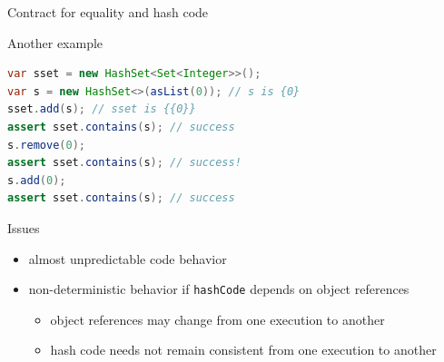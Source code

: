 \documentclass[10pt,usenames,dvipsnames]{beamer}
\begin{document}
\begin{frame}[fragile]{Contract for equality and hash code}
  \begin{block}{Another example}
    \begin{lstlisting}[language=Java]
var sset = new HashSet<Set<Integer>>();
var s = new HashSet<>(asList(0)); // s is {0}
sset.add(s); // sset is {{0}}
assert sset.contains(s); // success
s.remove(0);
assert sset.contains(s); // success!
s.add(0);
assert sset.contains(s); // success
    \end{lstlisting}
  \end{block}

  \begin{block}{Issues}
    \begin{itemize}
    \item almost unpredictable code behavior
    \item non-deterministic behavior if \lstinline{hashCode} depends on object references
      \begin{itemize}
      \item object references may change from one execution to another 
      \item hash code needs not remain consistent from one execution to another 
      \end{itemize}    
    \end{itemize}    
  \end{block}
\end{frame}

\end{document}
